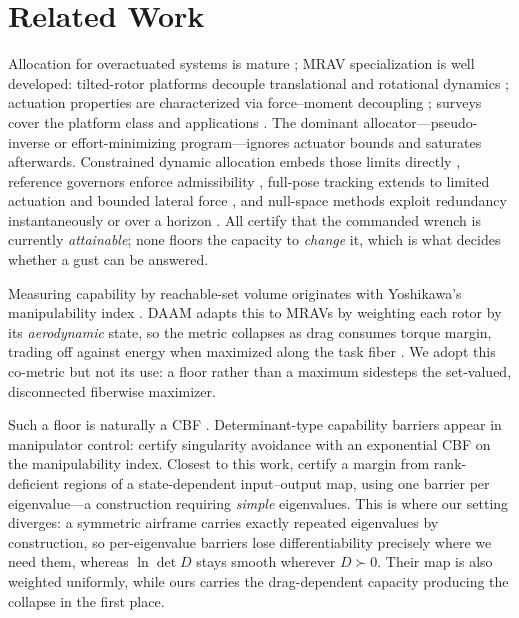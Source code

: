 \documentclass[letter, 10 pt, journal, twoside]{IEEEtran}
\theoremstyle{compact}
\begin{document}


\section{Related Work}
\label{sec:relatedWorkd}

Allocation for overactuated systems is mature \cite{Johansen2013}; \ac{MRAV} specialization is well developed: tilted-rotor platforms decouple translational and rotational dynamics \cite{Rashad2020, Allenspach2020}; actuation properties are characterized via force--moment decoupling \cite{Bicego2020}; surveys cover the platform class \cite{Hamandi2021} and applications \cite{Ollero2022}. The dominant allocator---pseudo-inverse or effort-minimizing program---ignores actuator bounds and saturates afterwards. Constrained dynamic allocation embeds those limits directly \cite{Harkegard2004}, reference governors enforce admissibility \cite{Convens2017}, full-pose tracking extends to limited actuation \cite{Hamandi2023} and bounded lateral force \cite{Franchi2018}, and null-space methods exploit redundancy instantaneously \cite{Su2021} or over a horizon \cite{Pretto2026}. All certify that the commanded wrench is currently \emph{attainable}; none floors the capacity to \emph{change} it, which is what decides whether a gust can be answered.

Measuring capability by reachable-set volume originates with Yoshikawa's manipulability index \cite{Yoshikawa1985}. \ac{DAAM} \cite{Franchi2026aeropromptness} adapts this to \acp{MRAV} by weighting each rotor by its \emph{aerodynamic} state, so the metric collapses as drag consumes torque margin, trading off against energy when maximized along the task fiber \cite{FranchiVADA}. We adopt this co-metric but not its use: a floor rather than a maximum sidesteps the set-valued, disconnected fiberwise maximizer.

Such a floor is naturally a \ac{CBF} \cite{Ames2019}. Determinant-type capability barriers appear in manipulator control: \cite{Kurtz2021} certify singularity avoidance with an exponential \ac{CBF} on the manipulability index. %
Closest to this work, \cite{Forghani2026singularity} certify a margin from rank-deficient regions of a state-dependent input--output map, using one barrier per eigenvalue---a construction requiring \emph{simple} eigenvalues. This is where our setting diverges: a symmetric airframe carries exactly repeated eigenvalues by construction, so per-eigenvalue barriers lose differentiability precisely where we need them, whereas $\ln\det D$ stays smooth wherever $D\succ0$. Their map is also weighted uniformly, while ours carries the drag-dependent capacity producing the collapse in the first place.
\end{document}
